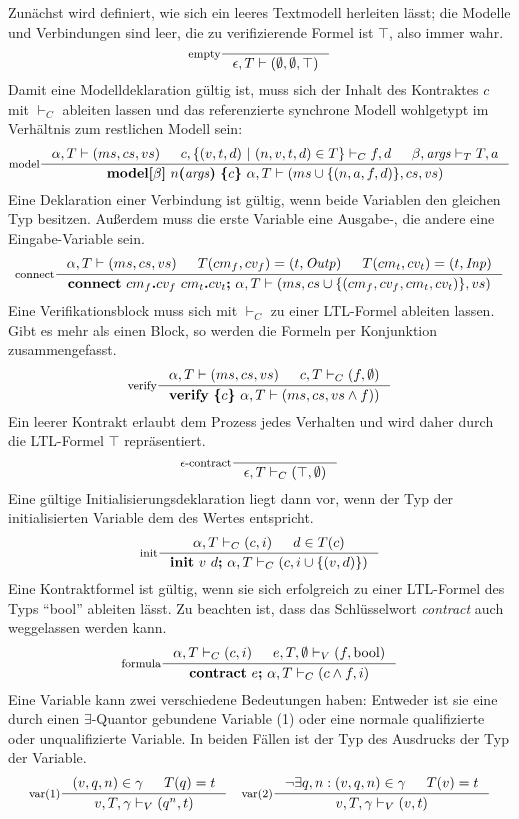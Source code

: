 Zunächst wird definiert, wie sich ein leeres Textmodell herleiten lässt; die Modelle und Verbindungen sind leer, die zu verifizierende Formel ist $\top$, also immer wahr.
\[
\inference[empty]{}{\epsilon,T\vdash (\emptyset,\emptyset,\top)}
\]
Damit eine Modelldeklaration gültig ist, muss sich der Inhalt des Kontraktes $c$ mit $\vdash_C$ ableiten lassen und das referenzierte synchrone Modell wohlgetypt im Verhältnis zum restlichen Modell sein:
\[
\inference[model]{\alpha,T \vdash(ms,cs,vs) & c,\{ (v,t,d)\ |\ (n,v,t,d)\in T \}\vdash_C f,d & \beta,\mathit{args}\vdash_T T,a}{\textbf{model[}\beta\textbf{]}\ n\textbf{(}\mathit{args}\textbf{)}\ \textbf{\{} c\textbf{\}}\ \alpha,T\vdash(ms\cup\{(n,a,f,d)\},cs,vs)}
\]
Eine Deklaration einer Verbindung ist gültig, wenn beide Variablen den gleichen Typ besitzen.
Außerdem muss die erste Variable eine Ausgabe-, die andere eine Eingabe-Variable sein.
\[
\inference[connect]{\alpha,T\vdash(ms,cs,vs) & T(cm_f,cv_f)=(t,\mathit{Outp}) & T(cm_t,cv_t) = (t,\mathit{Inp})}{\textbf{connect}\ cm_f\textbf{.}cv_f\ cm_t\textbf{.}cv_t\textbf{;}\ \alpha,T\vdash(ms,cs\cup\{(cm_f,cv_f,cm_t,cv_t)\},vs)}
\]
Eine Verifikationsblock muss sich mit $\vdash_C$ zu einer LTL-Formel ableiten lassen.
Gibt es mehr als einen Block, so werden die Formeln per Konjunktion zusammengefasst.
\[
\inference[verify]{\alpha,T\vdash(ms,cs,vs) & c,T\vdash_C (f,\emptyset)}{\textbf{verify}\ \textbf{\{}c\textbf{\}}\ \alpha,T\vdash (ms,cs,vs\land f))}
\]
Ein leerer Kontrakt erlaubt dem Prozess jedes Verhalten und wird daher durch die LTL-Formel $\top$ repräsentiert.
\[
\inference[$\epsilon$-contract]{}{\epsilon,T\vdash_C (\top,\emptyset)}
\]
Eine gültige Initialisierungsdeklaration liegt dann vor, wenn der Typ der initialisierten Variable dem des Wertes entspricht.
\[
\inference[init]{\alpha,T\vdash_C (c,i) & d\in T(c)}{\textbf{init}\ v\ d\textbf{;}\ \alpha,T\vdash_C (c,i\cup\{(v,d)\})}
\]
Eine Kontraktformel ist gültig, wenn sie sich erfolgreich zu einer LTL-Formel des Typs "`bool"' ableiten lässt.
Zu beachten ist, dass das Schlüsselwort \emph{contract} auch weggelassen werden kann.
\[
\inference[formula]{\alpha,T\vdash_C (c,i) & e,T,\emptyset\vdash_V (f,\textrm{bool})}{\textbf{contract}\ e\textbf{;}\ \alpha,T\vdash_C (c\land f,i)}
\]
Eine Variable kann zwei verschiedene Bedeutungen haben:
Entweder ist sie eine durch einen $\exists$-Quantor gebundene Variable (1) oder eine normale qualifizierte oder unqualifizierte Variable.
In beiden Fällen ist der Typ des Ausdrucks der Typ der Variable.
\[
\begin{array}{ll}
  \inference[var(1)]{(v,q,n)\in\gamma & T(q)=t}{v,T,\gamma\vdash_V (q^n,t)} &
  \inference[var(2)]{\lnot\exists q,n: (v,q,n)\in\gamma & T(v)=t}{v,T,\gamma\vdash_V (v,t)}
\end{array}
\]
